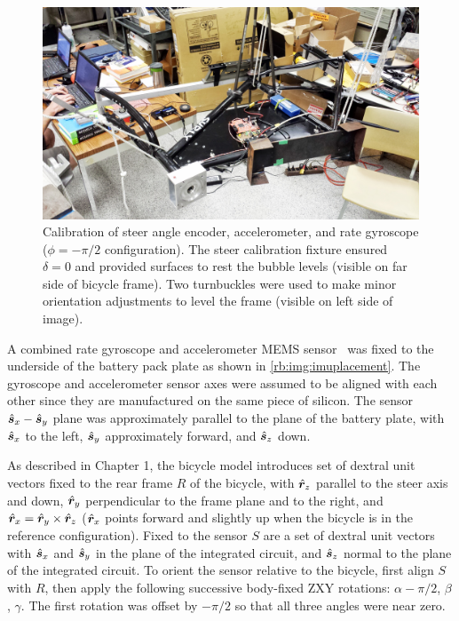 \begin{figure}[htbp]
  \centering
  \includegraphics[width=\textwidth]{images/20130711_163732_2.jpg}
  \caption[Calibration of steer angle encoder, accelerometer, and rate
    gyroscope.]{Calibration of steer angle encoder, accelerometer, and rate
    gyroscope ($\phi=-\pi/2$ configuration). The steer calibration fixture
    ensured $\delta=0$ and provided surfaces to rest the bubble levels (visible
    on far side of bicycle frame). Two turnbuckles were used to make minor
    orientation adjustments to level the frame (visible on left side of image).}
  \label{rb:img:calibration}
\end{figure}

A combined rate gyroscope and accelerometer MEMS
sensor~\cite{InvensenseMPU6050} was fixed to the underside of the battery pack
plate as shown in \autoref{rb:img:imuplacement}. The gyroscope and
accelerometer sensor axes were assumed to be aligned with each other since they
are manufactured on the same piece of silicon. The sensor $\hat{\boldsymbol{s}}_{x}-\hat{\boldsymbol{s}}_{y}$
plane was approximately parallel to the plane of the battery plate, with
$\hat{\boldsymbol{s}}_{x}$ to the left, $\hat{\boldsymbol{s}}_{y}$ approximately forward, and $\hat{\boldsymbol{s}}_{z}$
down.

As described in Chapter 1, the bicycle model introduces set of dextral unit
vectors fixed to the rear frame $R$ of the bicycle, with $\hat{\boldsymbol{r}}_{z}$ parallel to
the steer axis and down, $\hat{\boldsymbol{r}}_{y}$ perpendicular to the frame plane and to the
right, and $\hat{\boldsymbol{r}}_{x} = \hat{\boldsymbol{r}}_{y} \times \hat{\boldsymbol{r}}_{z}$ ($\hat{\boldsymbol{r}}_{x}$ points forward and
slightly up when the bicycle is in the reference configuration). Fixed to the sensor $S$
are a set of dextral unit vectors with $\hat{\boldsymbol{s}}_{x}$ and $\hat{\boldsymbol{s}}_{y}$ in the plane
of the integrated circuit, and $\hat{\boldsymbol{s}}_{z}$ normal to the plane of the integrated
circuit. To orient the sensor relative to the bicycle, first align $S$ with
$R$, then apply the following successive body-fixed ZXY rotations: $\alpha -
\pi/2$, $\beta$, $\gamma$. The first rotation was offset by $-\pi/2$ so that
all three angles were near zero.

